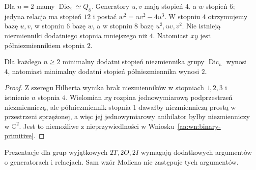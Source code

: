 \begin{przyklad}
Dla $n=2$ mamy $\operatorname{Dic}_2\simeq Q_8$.
Generatory $u,v$ mają stopień $4$, a $w$ stopień $6$;
jedyna relacja ma stopień $12$ i postać
$w^2=uv^2-4u^3$. W stopniu $4$ otrzymujemy bazę
$u,v$, w stopniu $6$ bazę $w$, a w stopniu $8$
bazę $u^2,uv,v^2$. Nie istnieją niezmienniki
dodatniego stopnia mniejszego niż $4$.
Natomiast $xy$ jest półniezmiennikiem stopnia $2$.
\end{przyklad}

\begin{wniosek}
\label{aa:wn:dicyclic-invariant-minimum}
Dla każdego $n\ge2$ minimalny dodatni stopień
niezmiennika grupy $\operatorname{Dic}_n$ wynosi $4$,
natomiast minimalny dodatni stopień półniezmiennika
wynosi $2$.
\end{wniosek}
\begin{proof}
Z szeregu Hilberta wynika brak niezmienników
w stopniach $1,2,3$ i istnienie $u$ stopnia $4$.
Wielomian $xy$ rozpina jednowymiarową podprzestrzeń
niezmienniczą, ale półniezmiennik stopnia $1$
dawałby niezmienniczą prostą w przestrzeni sprzężonej,
a więc jej jednowymiarowy anihilator byłby niezmienniczy
w $\mathbb C^2$. Jest to niemożliwe z nieprzywiedlności
w Wniosku~\ref{aa:wn:binary-primitive}.
\end{proof}

Prezentacje dla grup wyjątkowych $2T,2O,2I$ wymagają
dodatkowych argumentów o generatorach i relacjach.
Sam wzór Moliena nie zastępuje tych argumentów.
